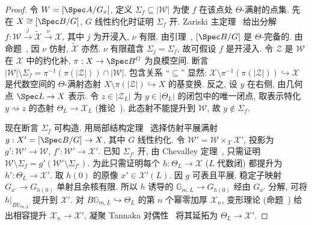 \begin{proof}
令 $\mathcal W=[\Spec A/G_x]$, 定义 $\Sigma_f\subseteq|\mathcal W|$ 为使 $f$ 在该点处 $\Theta$-满射的点集. 先在 $\mathcal X\cong[\Spec B/G]$, $G$ 线性约化时证明 $\Sigma_f$ 开. Zariski 主定理~ 给出分解 $f:\mathcal W\xrightarrow{j}\widetilde{\mathcal X}\xrightarrow{\nu}\mathcal X$, 其中 $j$ 为开浸入, $\nu$ 有限. 由引理~, $[\Spec B/G]$ 是 $\Theta$-完备的. 由命题~, 因 $\nu$ 仿射, $\widetilde{\mathcal X}$ 亦然. $\nu$ 有限蕴含 $\Sigma_j=\Sigma_f$, 故可假设 $f$ 是开浸入. 令 $\mathcal Z$ 是 $\mathcal W$ 在 $\mathcal X$ 中的约化补, $\pi:\mathcal X\to\Spec B^G$ 为良模空间. 断言 $|\mathcal W|\setminus\Sigma_f=\pi^{-1}(\pi(|\mathcal Z|))\cap|\mathcal W|$. 包含关系 ``$\subseteq$'' 显然: $\mathcal X\setminus\pi^{-1}(\pi(|\mathcal Z|))\hookrightarrow\mathcal X$ 是代数空间的 $\Theta$-满射态射 $X\setminus\pi(|\mathcal Z|)\hookrightarrow X$ 的基变换. 反之, 设 $y$ 在右侧, 由几何点 $\Spec L\to\mathcal X$ 表示. 令 $z\in|\mathcal Z_L|$ 为 $y\in|\Theta_L|$ 的闭包中的唯一闭点, 取表示特化 $y\rightsquigarrow z$ 的态射 $\Theta_L\to\mathcal X_L$ (推论~). 此态射不能提升到 $\mathcal W$, 故 $y\notin\Sigma_f$.

现在断言 $\Sigma_f$ 可构造. 用局部结构定理~ 选择仿射平展满射 $g:\mathcal X'=[\Spec B/G]\to\mathcal X$, 其中 $G$ 线性约化. 令 $\mathcal W'=\mathcal W\times_{\mathcal X}\mathcal X'$, 投影为 $g':\mathcal W'\to\mathcal W$, $f':\mathcal W'\to\mathcal X'$. 已知 $\Sigma_{f'}$ 开, 由 Chevalley 定理~, 只需证明 $\mathcal W\setminus\Sigma_f=g'(\mathcal W'\setminus\Sigma_{f'})$. 为此只需证明每个 $h:\Theta_L\to\mathcal X$ ($L$ 代数闭) 都提升为 $h':\Theta_L\to\mathcal X'$. 取 $h(0)$ 的原像 $x'\in\mathcal X'(L)$. 因 $g$ 可表且平展, 稳定子映射 $G_{x'}\to G_{h(0)}$ 单射且余核有限. 所以 $h$ 诱导的 $\mathbb G_{m,L}\to G_{h(0)}$ 经由 $G_{x'}$ 分解, 可将 $h|_{B\mathbb G_{m,L}}$ 提升到 $\mathcal X'$. 对 $B\mathbb G_{m,L}\hookrightarrow\Theta_L$ 的第 $n$ 个幂零加厚 $\mathcal X_n$, 变形理论 (命题~) 给出相容提升 $\mathcal X_n\to\mathcal X'$, 凝聚 Tannaka 对偶性~ 将其延拓为 $\Theta_L\to\mathcal X'$.


\end{proof}

